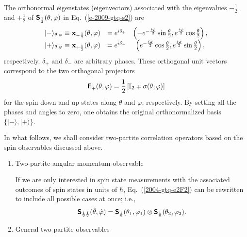 {The  orthonormal eigenstates (eigenvectors)  associated with the eigenvalues $-\frac{1}{2}$ and $+\frac{1}{2}$ of
$\textsf{\textbf{S}}_\frac{1}{2}(\theta , \varphi )$ in Eq.~(\ref{e-2009-gtq-s2})
are
\begin{equation}
\label{e-2009-gtq-s2ev}
\begin{array}{cccc}
\vert -\rangle_{\theta ,\varphi} \equiv {\bf x}_{-\frac{1}{2}}(\theta ,\varphi)&=e^{i\delta_{+}}& \left(-
e^{-\frac{i\varphi}{2}} \sin{\theta \over 2} ,e^{\frac{i\varphi}{2}}  \cos{\theta \over 2}
\right),\\
\vert +\rangle_{\theta ,\varphi} \equiv {\bf x}_{+\frac{1}{2}}(\theta ,\varphi)&=e^{i\delta_{-}}& \left(
e^{-\frac{i\varphi}{2}} \cos{\theta \over 2}, e^{\frac{i\varphi}{2}}\sin{\theta \over 2}
\right) ,
\end{array}
\end{equation}
respectively. $\delta_{+}$ and $\delta_{-}$ are arbitrary phases.
These orthogonal unit vectors correspond to the two orthogonal projectors
\begin{equation}
\label{e-2009-gtq-s2evproj}
 \textsf{\textbf{F}}_\mp (\theta ,\varphi ) =
\frac{1}{2}
\left[
{\Bbb I}_2 \mp \sigma (\theta ,\varphi)
\right]
\end{equation}
for the spin down and up states along $\theta $ and $\varphi$, respectively.
By setting all the phases and angles to zero, one obtains the original
orthonormalized basis $\{\vert -\rangle,\vert +\rangle\}$.

In what follows, we shall consider two-partite correlation operators based on the spin observables discussed above.

\begin{enumerate}

\item{Two-partite angular momentum observable}

If we are only interested in spin state measurements with the associated outcomes of spin states in units of $\hbar$,
Eq.~(\ref{2004-gtq-e2F2}) can be rewritten to include all possible cases at once; i.e.,
\begin{equation}
 \textsf{\textbf{S}}_{\frac{1}{2} \frac{1}{2} } ({\hat \theta},{\hat \varphi} ) =
 \textsf{\textbf{S}}_{\frac{1}{2} }( \theta_1,\varphi_1 )
\otimes
 \textsf{\textbf{S}}_{\frac{1}{2} }( \theta_2,\varphi_2 ).
\label{2004-gtq-e2F2nat}
\end{equation}

\item{General two-partite observables}



\end{enumerate}}
